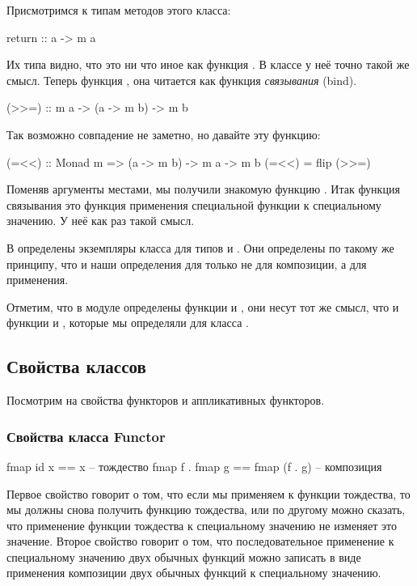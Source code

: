 Присмотримся к типам методов этого класса:

\begin{code}
return :: a -> m a
\end{code}

Их типа видно, что это ни что иное как функция . 
В классе  у неё точно такой же смысл. 
Теперь функция \In{>>=}, она читается как функция 
\emph{связывания} (bind). 

\begin{code}
(>>=)  :: m a -> (a -> m b) -> m b
\end{code}

Так возможно совпадение не заметно, но давайте 
эту функцию:

\begin{code}
(=<<)  :: Monad m => (a -> m b) -> m a -> m b
(=<<) = flip (>>=)
\end{code}

Поменяв аргументы местами, мы получили знакомую функцию \In{*$}.
Итак функция связывания это функция применения специальной
функции к специальному значению. У неё как раз такой смысл.

В  определены экземпляры класса 
для типов  и \In{[]}.  
Они определены по такому же принципу,
что и наши определения для  только не 
для композиции, а для применения. 

Отметим, что в модуле  определены 
функции  и , они несут тот
же смысл, что и функции  и ,
которые мы определяли для класса . 

\subsection{Свойства классов}

Посмотрим на свойства функторов и аппликативных функторов.

\subsubsection{Свойства класса Functor}

\begin{code}
fmap id x           == x                -- тождество
fmap f . fmap g     == fmap (f . g)     -- композиция
\end{code}

Первое свойство говорит о том, что если мы применяем
 к функции тождества, то мы должны снова получить
функцию тождества, или по другому можно сказать, что 
применение функции тождества к специальному значению не 
изменяет это значение. Второе свойство говорит о том, что
последовательное применение к специальному значению двух 
обычных функций можно записать в виде применения композиции
двух обычных функций к специальному значению.

